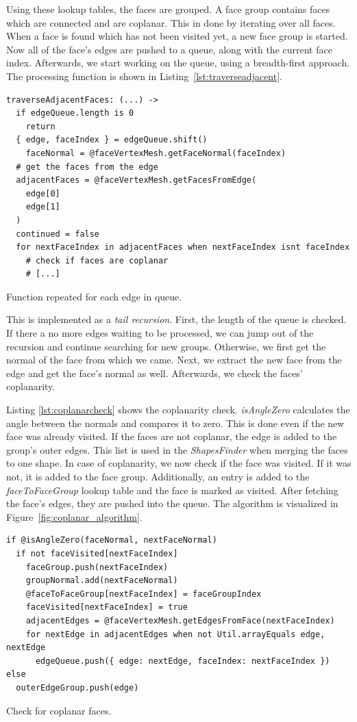 \documentclass[../ClassicThesis.tex]{subfiles}
\begin{document}
Using these lookup tables, the faces are grouped. A face group contains faces which are connected and are coplanar. This in done by iterating over all faces. When a face is found which has not been visited yet, a new face group is started. Now all of the face's edges are pushed to a queue, along with the current face index. Afterwards, we start working on the queue, using a breadth-first approach. The processing function is shown in Listing~\ref{lst:traverseadjacent}.

\begin{listing}
\begin{verbatim}
traverseAdjacentFaces: (...) ->
  if edgeQueue.length is 0
    return
  { edge, faceIndex } = edgeQueue.shift()
    faceNormal = @faceVertexMesh.getFaceNormal(faceIndex)
  # get the faces from the edge
  adjacentFaces = @faceVertexMesh.getFacesFromEdge(
    edge[0]
    edge[1]
  )
  continued = false
  for nextFaceIndex in adjacentFaces when nextFaceIndex isnt faceIndex
    # check if faces are coplanar
    # [...]
\end{verbatim}
\caption{Function repeated for each edge in queue.}
\label{lst:traverseadjacent}
\end{listing}

This is implemented as a \emph{tail recursion}. First, the length of the queue is checked. If there a no more edges waiting to be processed, we can jump out of the recursion and continue searching for new groups. Otherwise, we first get the normal of the face from which we came. Next, we extract the new face from the edge and get the face's normal as well. Afterwards, we check the faces' coplanarity.

Listing \ref{lst:coplanarcheck} shows the coplanarity check. \emph{isAngleZero} calculates the angle between the normals and compares it to zero. This is done even if the new face was already visited. If the faces are not coplanar, the edge is added to the group's outer edges. This list is used in the \emph{ShapesFinder} when merging the faces to one shape. In case of coplanarity, we now check if the face was visited. If it was not, it is added to the face group. Additionally, an entry is added to the \emph{faceToFaceGroup} lookup table and the face is marked as visited. After fetching the face's edges, they are pushed into the queue. The algorithm is visualized in Figure~\ref{fig:coplanar_algorithm}.

\begin{listing}
\begin{verbatim}
if @isAngleZero(faceNormal, nextFaceNormal)
  if not faceVisited[nextFaceIndex]
    faceGroup.push(nextFaceIndex)
    groupNormal.add(nextFaceNormal)
    @faceToFaceGroup[nextFaceIndex] = faceGroupIndex
    faceVisited[nextFaceIndex] = true
    adjacentEdges = @faceVertexMesh.getEdgesFromFace(nextFaceIndex)
    for nextEdge in adjacentEdges when not Util.arrayEquals edge, nextEdge
      edgeQueue.push({ edge: nextEdge, faceIndex: nextFaceIndex })
else
  outerEdgeGroup.push(edge)
\end{verbatim}
\caption{Check for coplanar faces.}
\label{lst:coplanarcheck}
\end{listing}
\end{document}
